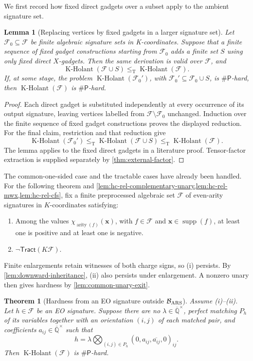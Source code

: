 \documentclass[11pt,letterpaper,onecolumn]{article}
\theoremstyle{plain}
\newtheorem{theorem}{Theorem}[section]
\newtheorem{lemma}[lemma]{Lemma}
\theoremstyle{definition}
\theoremstyle{remark}
\newcommand{\AlgNums}{\overline{\mathbb Q}}
\newcommand{\cF}{\mathcal F}
\newcommand{\KHolant}{\operatorname{K\text{-}Holant}}
\newcommand{\Tract}{\mathsf{Tract}}
\newcommand{\SharpP}{\#\mathsf P}
\newcommand{\supp}{\operatorname{supp}}
\newcommand{\arity}{\operatorname{arity}}
\newcommand{\leT}{\leq_{\mathrm T}}
\begin{document}
We first record how fixed direct gadgets over a subset apply to the ambient signature set.
	
	\begin{lemma}[Replacing vertices by fixed gadgets in a larger signature set]
		\label{lem:ambient-eo-lifting}
		Let \(\cF_0\subseteq\cF\) be finite algebraic signature sets in
		K-coordinates.  Suppose that a finite sequence of fixed gadget constructions starting from
		\(\cF_0\) adds a finite set \(S\) using only fixed direct \(X\)-gadgets.
		Then the same derivation is valid over \(\cF\), and
		\[
		\KHolant(\cF\cup S)\leT\KHolant(\cF).
		\]
		If, at some stage, the problem \(\KHolant(\cF_0')\), with
		\(\cF_0'\subseteq\cF_0\cup S\), is \(\SharpP\)-hard, then
		\(\KHolant(\cF)\) is \(\SharpP\)-hard.
	\end{lemma}
	
	\begin{proof}
		Each direct gadget is substituted independently at every occurrence of its
		output signature, leaving vertices labelled from \(\cF\setminus\cF_0\)
		unchanged.  Induction over the finite sequence of fixed gadget constructions proves the displayed
		reduction.  For the final claim, restriction and that reduction give
		\[
		\KHolant(\cF_0')
		\leT\KHolant(\cF\cup S)
		\leT\KHolant(\cF).
		\]
        The lemma applies to the fixed direct gadgets in a literature proof.
        Tensor-factor extraction is supplied separately by \cref{thm:external-factor}.
	\end{proof}
	
	The common-one-sided case and the tractable cases have already been handled.
For the following theorem and
\cref{lem:hc-rel-complementary-unary,lem:hc-rel-mwx,lem:hc-rel-cfs},
fix a finite preprocessed algebraic set \(\cF\) of even-arity signatures in
\(K\)-coordinates satisfying:
	\begin{enumerate}[label=\textnormal{(\roman*)},leftmargin=*,labelindent=0pt]
		\item Among the values \(\chi_{\arity(f)}({\mathbf x})\), with \(f\in\cF\)
		and \({\mathbf x}\in\supp(f)\), at least one is positive and at least one
		is negative.
		\item \(\neg\Tract(K\cF)\).
	\end{enumerate}
Finite enlargements retain witnesses of both charge signs, so (i) persists.
By \cref{lem:downward-inheritance}, (ii) also persists under enlargement.
A nonzero unary then gives hardness by \cref{lem:common-unary-exit}.

	\begin{theorem}[Hardness from an EO signature outside \(\mathcal B_{\rm ARS}\)]
		\label{thm:hc-relative-eo-terminal}
		Assume (i)--(ii). Let \(h\in\cF\) be an EO signature.  Suppose there are no
		\(\lambda\in\AlgNums^\times\), perfect matching \(P_h\) of its variables
		together with an orientation \((i,j)\) of each matched pair, and coefficients
		\(a_{ij}\in\AlgNums^\times\) such that
		\[
		h=\lambda
		\bigotimes_{(i,j)\in P_h}(0,a_{ij},\overline{a_{ij}},0)_{ij}.
		\]
		Then \(\KHolant(\cF)\) is \(\SharpP\)-hard.
	\end{theorem}
	
\end{document}
